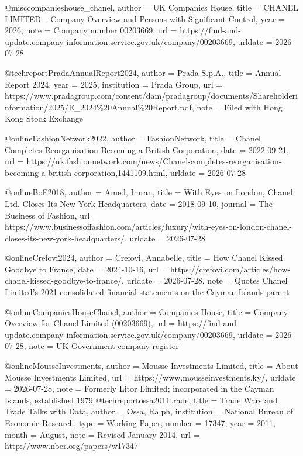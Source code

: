 @misc{companieshouse_chanel,
  author       = {{UK Companies House}},
  title        = {{CHANEL LIMITED} -- Company Overview and Persons with Significant Control},
  year         = {2026},
  note         = {Company number 00203669},
  url          = {https://find-and-update.company-information.service.gov.uk/company/00203669},
  urldate      = {2026-07-28}
}

@techreport{PradaAnnualReport2024,
  author       = {{Prada S.p.A.}},
  title        = {Annual Report 2024},
  year         = {2025},
  institution  = {Prada Group},
  url          = {https://www.pradagroup.com/content/dam/pradagroup/documents/Shareholderinformation/2025/E_2024\%20Annual\%20Report.pdf},
  note         = {Filed with Hong Kong Stock Exchange}
}

@online{FashionNetwork2022,
  author       = {{FashionNetwork}},
  title        = {Chanel Completes Reorganisation Becoming a {British} Corporation},
  date         = {2022-09-21},
  url          = {https://uk.fashionnetwork.com/news/Chanel-completes-reorganisation-becoming-a-british-corporation,1441109.html},
  urldate      = {2026-07-28}
}

@online{BoF2018,
  author       = {Amed, Imran},
  title        = {With Eyes on {London}, {Chanel Ltd.} Closes Its {New York} Headquarters},
  date         = {2018-09-10},
  journal      = {The Business of Fashion},
  url          = {https://www.businessoffashion.com/articles/luxury/with-eyes-on-london-chanel-closes-its-new-york-headquarters/},
  urldate      = {2026-07-28}
}

@online{Crefovi2024,
  author       = {Crefovi, Annabelle},
  title        = {How {Chanel} Kissed Goodbye to {France}},
  date         = {2024-10-16},
  url          = {https://crefovi.com/articles/how-chanel-kissed-goodbye-to-france/},
  urldate      = {2026-07-28},
  note         = {Quotes Chanel Limited's 2021 consolidated financial statements on the Cayman Islands parent}
}

@online{CompaniesHouseChanel,
  author       = {{Companies House}},
  title        = {Company Overview for {Chanel Limited} (00203669)},
  url          = {https://find-and-update.company-information.service.gov.uk/company/00203669},
  urldate      = {2026-07-28},
  note         = {UK Government company register}
}

@online{MousseInvestments,
  author       = {{Mousse Investments Limited}},
  title        = {About {Mousse Investments Limited}},
  url          = {https://www.mousseinvestments.ky/},
  urldate      = {2026-07-28},
  note         = {Formerly Litor Limited; incorporated in the Cayman Islands, established 1979}
}
@techreport{ossa2011trade,
  title       = {Trade Wars and Trade Talks with Data},
  author      = {Ossa, Ralph},
  institution = {National Bureau of Economic Research},
  type        = {Working Paper},
  number      = {17347},
  year        = {2011},
  month       = {August},
  note        = {Revised January 2014},
  url         = {http://www.nber.org/papers/w17347}
}

